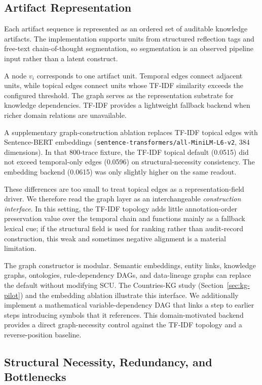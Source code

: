 \documentclass[pdflatex,sn-mathphys-num,iicol]{sn-jnl}
\begin{document}
\subsection{Artifact Representation}

Each artifact sequence is represented as an ordered set of auditable knowledge artifacts. The implementation supports units from structured reflection tags and free-text chain-of-thought segmentation, so segmentation is an observed pipeline input rather than a latent construct.

A node $v_i$ corresponds to one artifact unit. Temporal edges connect adjacent units, while topical edges connect units whose TF-IDF similarity exceeds the configured threshold. The graph serves as the representation substrate for knowledge dependencies. TF-IDF provides a lightweight fallback backend when richer domain relations are unavailable.

A supplementary graph-construction ablation replaces TF-IDF topical edges with Sentence-BERT embeddings (\texttt{sentence-transformers/all-MiniLM-L6-v2}, 384 dimensions). In that 800-trace fixture, the TF-IDF topical default (0.0515) did not exceed temporal-only edges (0.0596) on structural-necessity consistency. The embedding backend (0.0615) was only slightly higher on the same readout.

These differences are too small to treat topical edges as a representation-field driver. We therefore read the graph layer as an interchangeable \emph{construction interface}. In this setting, the TF-IDF topology adds little annotation-order preservation value over the temporal chain and functions mainly as a fallback lexical cue; if the structural field is used for ranking rather than audit-record construction, this weak and sometimes negative alignment is a material limitation.

The graph constructor is modular. Semantic embeddings, entity links, knowledge graphs, ontologies, rule-dependency DAGs, and data-lineage graphs can replace the default without modifying SCU. The Countries-KG study (Section~\ref{sec:kg-pilot}) and the embedding ablation illustrate this interface. We additionally implement a mathematical variable-dependency DAG that links a step to earlier steps introducing symbols that it references. This domain-motivated backend provides a direct graph-necessity control against the TF-IDF topology and a reverse-position baseline.

\subsection{Structural Necessity, Redundancy, and Bottlenecks}
\end{document}
